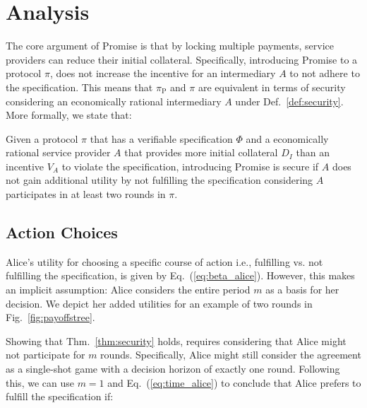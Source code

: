 \documentclass[runningheads]{llncs}
\newcommand{\sys}{Promise\xspace}
\begin{document}

\section{Analysis}
\label{sec:security}

The core argument of \sys is that by locking multiple payments, service providers can reduce their initial collateral.
Specifically, introducing \sys to a protocol $\pi$, does not increase the incentive for an intermediary $A$ to not adhere to the specification.
This means that $\pi_{\mathrm{P}}$ and $\pi$ are equivalent in terms of security considering an economically rational intermediary $A$ under Def.~\ref{def:security}.
More formally, we state that:

\begin{theorem}
\label{thm:security}
Given a protocol $\pi$ that has a verifiable specification $\Phi$ and a economically rational service provider $A$ that provides more initial collateral $D_I$ than an incentive $V_A$ to violate the specification, introducing \sys is secure if $A$ does not gain additional utility by not fulfilling the specification considering $A$ participates in at least two rounds in $\pi$.
\end{theorem}

\subsection{Action Choices}

Alice's utility for choosing a specific course of action i.e., fulfilling vs. not fulfilling the specification, is given by Eq.~(\ref{eq:beta_alice}).
However, this makes an implicit assumption: Alice considers the entire period $m$ as a basis for her decision.
We depict her added utilities for an example of two rounds in Fig.~\ref{fig:payoffstree}.



Showing that Thm.~\ref{thm:security} holds, requires considering that Alice might not participate for $m$ rounds.
Specifically, Alice might still consider the agreement as a single-shot game with a decision horizon of exactly one round.
Following this, we can use $m=1$ and Eq.~(\ref{eq:time_alice}) to conclude that Alice prefers to fulfill the specification if:
\end{document}
